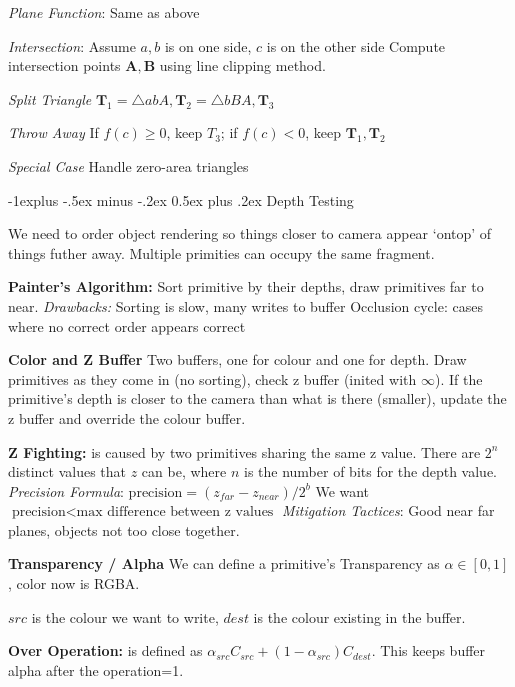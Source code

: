 \documentclass[letterpaper, 8pt]{extarticle}
\makeatletter
\renewcommand{\section}{\@startsection{section}{1}{0mm}%
                                {-1explus -.5ex minus -.2ex}%
                                {0.5ex plus .2ex}%
                                {\normalfont\small\bfseries}}
\makeatother
\begin{document}
\begin{multicols*}{4}
    \textit{Plane Function}:
    Same as above

    \textit{Intersection}:
    Assume \(a, b\) is on one side, \(c\) is on the other side
    Compute intersection points \(\mathbf{A}, \mathbf{B}\) using line clipping method.

    \textit{Split Triangle}
    \(\mathbf{T}_1=\triangle abA, \mathbf{T}_2=\triangle bBA, \mathbf{T}_3\)

    \textit{Throw Away}
    If \(f(c) \geq 0\), keep \(T_3\); if \(f(c) < 0\), keep \(\mathbf{T}_1, \mathbf{T}_2\)

    \textit{Special Case}
    Handle zero-area triangles

    \section{Depth Testing}

    We need to order object rendering so things closer to camera appear `ontop' of things futher away.
    Multiple primities can occupy the same fragment.

    \textbf{Painter's Algorithm:} Sort primitive by their depths, draw primitives far to near. \textit{Drawbacks:} Sorting is slow, many writes to buffer
    Occlusion cycle: cases where no correct order appears correct


    \textbf{Color and Z Buffer} Two buffers, one for colour and one for depth.
    Draw primitives as they come in (no sorting),
    check z buffer (inited with $\infty$).
    If the primitive's depth is closer to the camera than what is there (smaller), update the z buffer and override the colour buffer.

    \textbf{Z Fighting:} is caused by two primitives sharing the same z value. There are $2^n$ distinct values that $z$ can be, where $n$ is the number of bits for the depth value.
    \textit{Precision Formula}:
    \(
    \text{precision} = (z_{far} - z_{near}) / 2^b
    \)
    We want \(\text{precision} < \text{max difference between z values}\)
    \textit{Mitigation Tactices}: Good near far planes, objects not too close together.


    \textbf{Transparency / Alpha}
    We can define a primitive's Transparency as $\alpha \in [0, 1]$, color now is RGBA.

    $src$ is the colour we want to write, $dest$ is the colour existing in the buffer.

    \textbf{Over Operation:} is defined as $\alpha_{src}C_{src} + (1-\alpha_{src})C_{dest}$.
    This keeps buffer alpha after the operation=1.


\end{multicols*}
\end{document}
